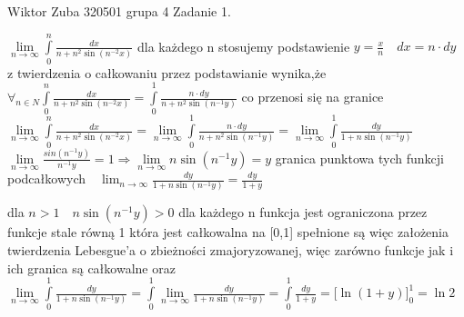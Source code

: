 \documentclass{article}
\begin{document}
Wiktor Zuba 320501 grupa 4
\newline
Zadanie 1.
\newline





$
\lim\limits_{n \to \infty}
\int\limits_{0}^{n}
\frac{dx}{n+n^2 \sin{(n^{-2}x)}}
$
\newline
dla każdego n stosujemy podstawienie $y=\frac{x}{n}\quad dx=n\cdot dy$
\newline
z twierdzenia o całkowaniu przez podstawianie wynika,że
\newline
$
\forall_{n\in N}
\int\limits_{0}^{n}
\frac{dx}{n+n^2 \sin{(n^{-2}x)}}
=
\int\limits_{0}^{1}
\frac{n\cdot dy}{n+n^2 \sin{(n^{-1}y)}}
$
co przenosi się na granice
\newline
$
\lim\limits_{n \to \infty}
\int\limits_{0}^{n}
\frac{dx}{n+n^2 \sin{(n^{-2}x)}}
=
\lim\limits_{n \to \infty}
\int\limits_{0}^{1}
\frac{n\cdot dy}{n+n^2 \sin{(n^{-1}y)}}
=
\lim\limits_{n \to \infty}
\int\limits_{0}^{1}
\frac{dy}{1+n \sin{(n^{-1}y)}}
$
\newline
$\lim\limits_{n \to \infty} \frac{sin(n^{-1}y)}{n^{-1}y}=1 \Rightarrow \lim\limits_{n \to \infty} n\sin{(n^{-1}y)}=y$
\newline
granica punktowa tych funkcji podcałkowych$\quad \lim_{n \to \infty} \frac{dy}{1+n \sin{(n^{-1}y)}} =\frac{dy}{1+y}$


dla $n>1 \quad n \sin{(n^{-1}y)} > 0$ dla każdego n funkcja jest ograniczona przez funkcje stale równą 1 która jest całkowalna na [0,1]
spełnione są więc założenia twierdzenia Lebesgue'a o zbieżności zmajoryzowanej, więc zarówno funkcje jak i ich granica są całkowalne oraz 
\newline
$\lim\limits_{n \to \infty}
\int\limits_{0}^{1}
\frac{dy}{1+n \sin{(n^{-1}y)}}
=
\int\limits_{0}^{1}
\lim\limits_{n \to \infty}
\frac{dy}{1+n \sin{(n^{-1}y)}}
=
\int\limits_{0}^{1}
\frac{dy}{1+y}
=
\biggl[
\ln{(1+y)}
\biggr]_{0}^{1}
=
\ln{2}
$
\end{document}
